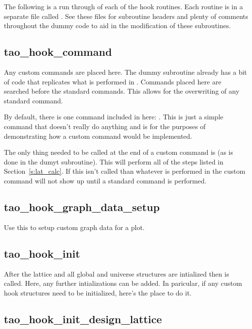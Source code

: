 The following is a run through of each of the hook routines. Each
routine is in a separate file called
. See these files for subroutine
headers and plenty of comments throughout the dummy code to aid in the
modification of these subroutines.

\subsection{tao\_hook\_command}

Any custom commands are placed here. The dummy subroutine already has
a bit of code that replicates what is performed in
. Commands placed here are searched before the
standard \tao commands. This allows for the overwriting of any
standard \tao command.

By default, there is one command included in here: . This
is just a simple command that doesn't really do anything and is for
the purposes of demonstrating how a custom command would be
implemented.

The only thing needed to be called at the end of a custom command is
 (as is done in the dumyt subroutine). This will
perform all of the steps listed in Section~\ref{s:lat_calc}. If this
isn't called than whatever is performed in the custom command will not
show up until a standard command is performed.

\subsection{tao\_hook\_graph\_data\_setup}

Use this to setup custom graph data for a plot.

\subsection{tao\_hook\_init}

After the lattice and all global and universe structures are
intialized then  is called. Here, any further
intializations can be added. In paricular, if any custom hook
structures need to be initialized, here's the place to do it.

\subsection{tao\_hook\_init\_design\_lattice}

